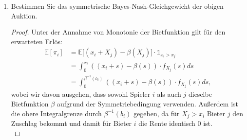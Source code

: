 \documentclass[12pt]{extreport} %
\theoremstyle{named}
\theoremstyle{nnamed}
\theoremstyle{itshape}
\theoremstyle{normal}
\begin{document}
\begin{enumerate}
	\item Bestimmen Sie das symmetrische Bayes-Nash-Gleichgewicht der obigen Auktion.
		\begin{proof}
			Unter der Annahme von Monotonie der Bietfunktion gilt für den erwarteten Erlös:
			\begin{align*}
				\mathds{E}[\pi_i] & = \mathds{E} \big[ \left(x_i + X_j\right) - \beta(X_j) \big] \cdot \mathds{1}_{x_i > x_j}\\
				& = \int_0^{x_i}  \left( \left(x_i + s\right) - \beta(s) \right) \cdot f_{X_j}(s) ds \\
				& = \int_0^{\beta^{-1}(b_i)}  \left( \left(x_i + s\right) - \beta(s) \right) \cdot f_{X_j}(s) ds,
			\end{align*}
			wobei wir davon ausgehen, dass sowohl Spieler $i$ als auch $j$ dieselbe Bietfunktion $\beta$ aufgrund der Symmetriebedingung verwenden. Außerdem ist die obere Integralgrenze durch $\beta^{-1}(b_i)$ gegeben, da für $X_j > x_i$ Bieter $j$ den Zuschlag bekommt und damit für Bieter $i$ die Rente identisch 0 ist. ~\\
			

\end{proof}
\end{enumerate}
\end{document}
